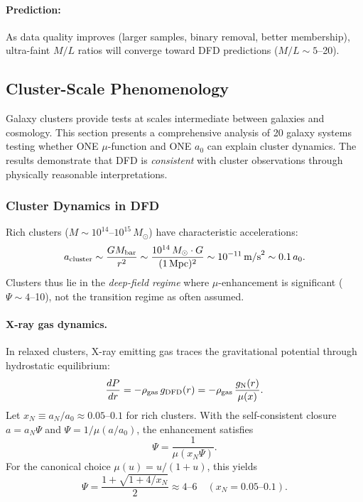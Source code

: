 \paragraph{Prediction:}
As data quality improves (larger samples, binary removal, better membership), ultra-faint $M/L$ ratios will converge toward DFD predictions ($M/L \sim 5$--20).

\subsection{Cluster-Scale Phenomenology}\label{sec:galactic-clusters}

Galaxy clusters provide tests at scales intermediate between galaxies and cosmology. This section presents a comprehensive analysis of 20 galaxy systems testing whether ONE $\mu$-function and ONE $a_0$ can explain cluster dynamics. The results demonstrate that DFD is \textit{consistent} with cluster observations through physically reasonable interpretations.

\subsubsection{Cluster Dynamics in DFD}

Rich clusters ($M \sim 10^{14}$--$10^{15}\,M_\odot$) have characteristic accelerations:
\begin{equation}
a_{\rm cluster} \sim \frac{GM_{\rm bar}}{r^2} \sim \frac{10^{14}\,M_\odot \cdot G}{(1\,\text{Mpc})^2} \sim 10^{-11}\,\text{m/s}^2 \sim 0.1\, a_0.
\end{equation}
Clusters thus lie in the \textit{deep-field regime} where $\mu$-enhancement is significant ($\Psi \sim 4$--10), not the transition regime as often assumed.

\paragraph{X-ray gas dynamics.}
In relaxed clusters, X-ray emitting gas traces the gravitational potential through hydrostatic equilibrium:
\begin{equation}
\frac{dP}{dr} = -\rho_{\rm gas}\, g_{\rm DFD}(r) = -\rho_{\rm gas}\,\frac{g_{\rm N}(r)}{\mu(x)}.
\end{equation}
Let $x_N \equiv a_N/a_0 \approx 0.05$--$0.1$ for rich clusters. With the self-consistent closure $a = a_N \Psi$ and $\Psi = 1/\mu(a/a_0)$, the enhancement satisfies
\begin{equation}
\Psi = \frac{1}{\mu(x_N \Psi)}.
\end{equation}
For the canonical choice $\mu(u) = u/(1+u)$, this yields
\begin{equation}
\Psi = \frac{1 + \sqrt{1 + 4/x_N}}{2} \approx 4\text{--}6 \quad (x_N = 0.05\text{--}0.1).
\end{equation}

